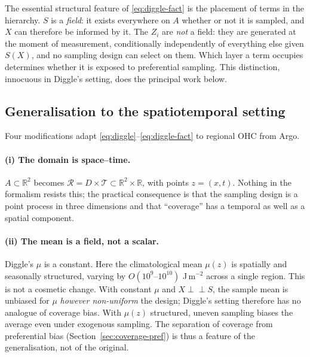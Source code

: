 \documentclass[11pt]{article}
\begin{document}
The essential structural feature of \eqref{eq:diggle-fact} is the placement of terms in the
hierarchy. $S$ is a \emph{field}: it exists everywhere on $A$ whether or not it is sampled, and
$X$ can therefore be informed by it. The $Z_i$ are \emph{not} a field: they are generated at
the moment of measurement, conditionally independently of everything else given $S(X)$, and no
sampling design can select on them. Which layer a term occupies determines whether it is
exposed to preferential sampling. This distinction, innocuous in Diggle's setting, does the
principal work below.

\subsection{Generalisation to the spatiotemporal setting}
\label{sec:model}

Four modifications adapt \eqref{eq:diggle}--\eqref{eq:diggle-fact} to regional OHC from Argo.

\paragraph{(i) The domain is space--time.} $A \subset \mathbb{R}^2$ becomes
$\mathcal{R} = D \times \mathcal{T} \subset \mathbb{R}^2 \times \mathbb{R}$, with points
$z = (x,t)$. Nothing in the formalism resists this; the practical consequence is that the
sampling design is a point process in three dimensions and that ``coverage'' has a temporal as
well as a spatial component.

\paragraph{(ii) The mean is a field, not a scalar.} Diggle's $\mu$ is a constant. Here the
climatological mean $\mu(z)$ is spatially and seasonally structured, varying by
$O(10^{9}\text{--}10^{10})$ J\,m$^{-2}$ across a single region. This is not a cosmetic change.
With constant $\mu$ and $X \perp\!\!\!\perp S$, the sample mean is unbiased for $\mu$
\emph{however non-uniform} the design; Diggle's setting therefore has no analogue of coverage
bias. With $\mu(z)$ structured, uneven sampling biases the average even under exogenous
sampling. The separation of coverage from preferential bias (Section~\ref{sec:coverage-pref})
is thus a feature of the generalisation, not of the original.
\end{document}
